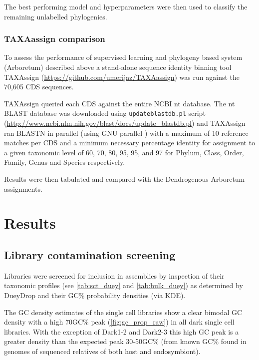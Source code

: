 The best performing model and hyperparameters were then used to classify the remaining
unlabelled phylogenies.

\subsubsection{TAXAassign comparison}

To assess the performance of supervised learning and phylogeny based system (Arboretum)
described above a stand-alone sequence identity binning tool TAXAssign (\url{https://github.com/umerijaz/TAXAassign}) was run 
against the 70,605 CDS sequences.  

TAXAssign queried each CDS against the entire NCBI nt database.
The nt BLAST database was downloaded using \texttt{updateblastdb.pl} script (\url{http://www.ncbi.nlm.nih.gov/blast/docs/update_blastdb.pl})
and TAXAssign ran BLASTN in parallel (using GNU parallel \citep{Tange2011a})
with a maximum of 10 reference matches
per CDS and a minimum necessary percentage identity for assignment
to a given taxonomic level of 60, 70, 80, 95, 95, and 97
for Phylum, Class, Order, Family, Genus and Species respectively. 

Results were then tabulated and compared with the Dendrogenous-Arboretum assignments.

\section{Results} 

\subsection{Library contamination screening}

Libraries were screened for inclusion in assemblies by inspection of their taxonomic
profiles (see \cref{tab:sct_duey} and \cref{tab:bulk_duey}) as determined by DueyDrop 
and their GC\% probability densities (via KDE).

The GC density estimates of the single cell libraries show a clear bimodal GC density
with a high 70GC\% peak (\cref{fig:gc_prop_raw}) in all dark single cell libraries. 
With the exception of Dark1-2 and Dark2-3 this high GC peak is a greater density
than the expected peak 30-50GC\% (from known GC\% found in genomes
of sequenced relatives of both host and endosymbiont).

